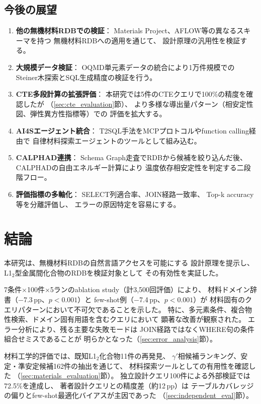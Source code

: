 \documentclass[5p,twocolumn]{elsarticle}
\begin{document}
\subsection{今後の展望}

\begin{enumerate}
  \item \textbf{他の無機材料RDBでの検証}：
    Materials Project、AFLOW等の異なるスキーマを持つ
    無機材料RDBへの適用を通じて、
    設計原理の汎用性を検証する。
  \item \textbf{大規模データ検証}：
    OQMD単元素データの統合により1万件規模での
    Steiner木探索とSQL生成精度の検証を行う。
  \item \textbf{CTE多段計算の拡張評価}：
    本研究では5件のCTEクエリで100\%の精度を確認したが
    （\ref{sec:cte_evaluation}節）、
    より多様な導出量パターン（相安定性図、弾性異方性指標等）での
    評価を拡大する。
  \item \textbf{AI4Sエージェント統合}：
    T2SQL手法をMCPプロトコルやfunction calling経由で
    自律材料探索エージェントのツールとして組み込む。
  \item \textbf{CALPHAD連携}：
    Schema Graph走査でRDBから候補を絞り込んだ後、
    CALPHADの自由エネルギー計算により
    温度依存相安定性を判定する二段階フロー。
  \item \textbf{評価指標の多軸化}：
    SELECT列適合率、JOIN経路一致率、
    Top-k accuracy等を分離評価し、
    エラーの原因特定を容易にする。
\end{enumerate}

\section{結論}
\label{sec:conclusion}

本研究は、無機材料RDBの自然言語アクセスを可能にする
設計原理を提示し、L1$_2$型金属間化合物のRDBを検証対象として
その有効性を実証した。

7条件$\times$100件$\times$5ランのablation study（計3{,}500回評価）により、
材料ドメイン辞書（$-$7.3\,pp、$p<0.001$）と
few-shot例（$-$7.4\,pp、$p<0.001$）が
材料固有のクエリパターンにおいて不可欠であることを示した。
特に、多元素条件、複合物性検索、ドメイン固有用語を含むクエリにおいて
顕著な改善が観察された。
エラー分析により、残る主要な失敗モードは
JOIN経路ではなくWHERE句の条件組合せミスであることが
明らかとなった（\ref{sec:error_analysis}節）。

材料工学的評価では、既知L1$_2$化合物11件の再発見、
$\gamma'$相候補ランキング、安定・準安定候補162件の抽出を通じて、
材料探索ツールとしての有用性を確認した
（\ref{sec:materials_evaluation}節）。
独立設計クエリ100件による外部検証では72.5\%を達成し、
著者設計クエリとの精度差（約12\,pp）は
テーブルカバレッジの偏りとfew-shot最適化バイアスが主因であった
（\ref{sec:independent_eval}節）。
\end{document}
